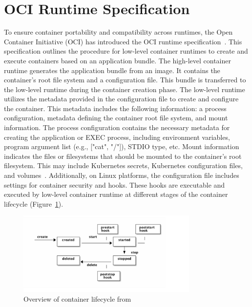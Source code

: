 \section{OCI Runtime Specification}
\label{sec:back_oci_runtime_spec}
To ensure container portability and compatibility across runtimes, the Open Container Initiative (OCI) has introduced the OCI runtime specification~\cite*{oci-runtime-spec}. This specification outlines the procedure for low-level container runtimes to create and execute containers based on an 
application bundle. The high-level container runtime generates the application bundle from an image. It contains the container's root file system and a configuration file. This bundle is transferred to the low-level runtime during the container creation phase. 
The low-level runtime utilizes the metadata provided in the configuration file to create and configure the container. This metadata includes the following information: a process configuration, metadata defining the container root file system, and mount information. The process configuration contains 
the necessary metadata for creating the application or EXEC process, including environment variables, program argument list (e.g., ["cat", "/"]), STDIO type, etc. Mount information indicates the files or filesystems that should be mounted to the container's root filesystem. This may include 
Kubernetes secrets, Kubernetes configuration files, and volumes~\cite*{k8s}. Additionally, on Linux platforms, the configuration file includes settings for container security and hooks. These hooks are executable and executed by low-level container runtime at 
different stages of the container lifecycle (Figure~\ref{fig:Container_Lifecycle_state}).
\begin{figure}[htp]
  \centering
  \includegraphics[width=0.8\textwidth]{images/Container_Lifecycle_state.PNG}
  \caption[Overview of container lifecycle]{Overview of container lifecycle from \cite*{oci_Lifecycle}}
  \label{fig:Container_Lifecycle_state}
\end{figure}


